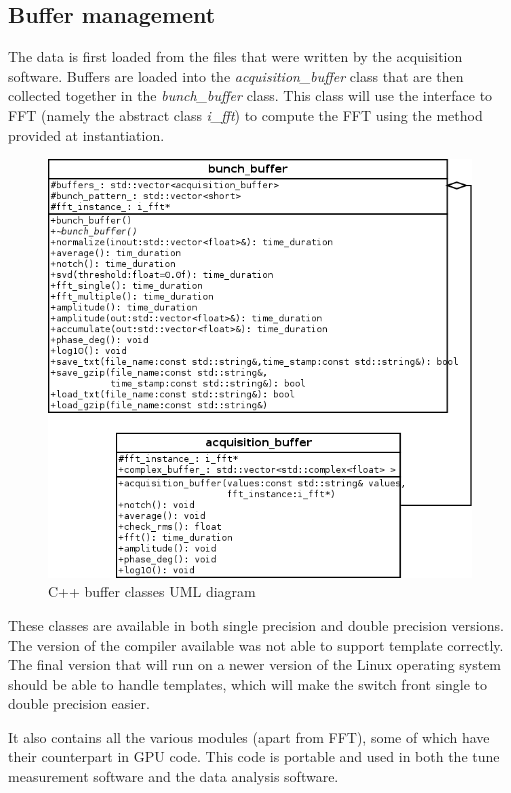 \subsection{Buffer management}

The data is first loaded from the files that were written by the
acquisition software. Buffers are loaded into the
\emph{acquisition\_buffer} class that are then collected together in
the \emph{bunch\_buffer} class. This class will use the interface to
\gls{FFT} (namely the abstract class \emph{i\_fft}) to compute the
\gls{FFT} using the method provided at instantiation.

\begin{figure}[H]
\centering
\caption{C++ buffer classes UML diagram}
\includegraphics[scale=0.5]{buffer_uml.png}
\end{figure}

These classes are available in both single precision and double precision versions. The version of the compiler available was not able to support template correctly. The final version that will run on a newer version of the Linux operating system should be able to handle templates, which will make the switch front single to double precision easier.

It also contains all the various modules (apart from \gls{FFT}), some of which have their counterpart in \gls{GPU} code. This code is portable and used in both the tune measurement software and the data analysis software.

